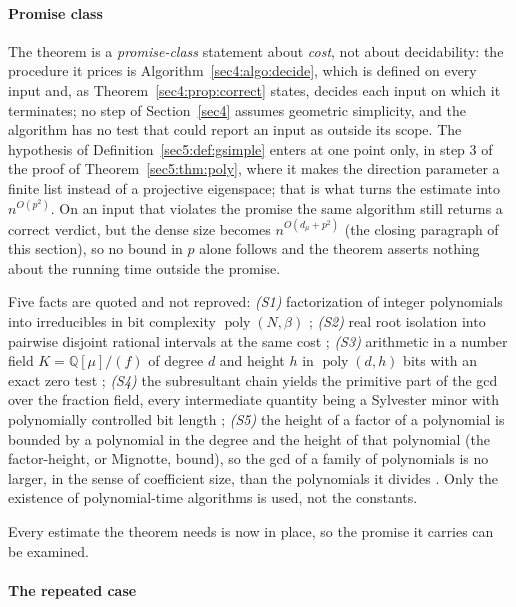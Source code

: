 \documentclass[journal]{IEEEtran}
\theoremstyle{plainn}
\theoremstyle{remark}
\newcommand{\poly}{\operatorname{poly}}
\begin{document}
\paragraph{Promise class} The theorem is a \emph{promise-class} statement about \emph{cost}, not about
decidability: the procedure it prices is Algorithm~\ref{sec4:algo:decide}, which is defined on every input
and, as Theorem~\ref{sec4:prop:correct} states, decides each input on which it terminates; no step of
Section~\ref{sec4} assumes geometric simplicity, and the algorithm has no test that could report an input
as outside its scope. The hypothesis of Definition~\ref{sec5:def:gsimple} enters at one point only, in
step 3 of the proof of Theorem~\ref{sec5:thm:poly}, where it makes the direction parameter a finite list
instead of a projective eigenspace; that is what turns the estimate into $n^{O(p^{2})}$. On an input that
violates the promise the same algorithm still returns a correct verdict, but the dense size becomes
$n^{O(d_\mu+p^{2})}$ (the closing paragraph of this section), so no bound in $p$ alone follows and the
theorem asserts nothing about the running time outside the promise.

Five facts are quoted and not reproved: \emph{(S1)} factorization of integer polynomials into
irreducibles in bit complexity $\poly(N,\beta)$ \cite{vzgg03}; \emph{(S2)} real root isolation into
pairwise disjoint rational intervals at the same cost \cite{bpr06}; \emph{(S3)} arithmetic in a number
field $K=\mathbb{Q}[\mu]/(f)$ of degree $d$ and height $h$ in $\poly(d,h)$ bits with an exact zero
test \cite{lan02,vzgg03}; \emph{(S4)} the subresultant chain yields the primitive part of the gcd over
the fraction field, every intermediate quantity being a Sylvester minor with polynomially controlled
bit length \cite{vzgg03}; \emph{(S5)} the height of a factor of a polynomial is bounded by a polynomial
in the degree and the height of that polynomial (the factor-height, or Mignotte, bound), so the gcd of
a family of polynomials is no larger, in the sense of coefficient size, than the polynomials it divides
\cite{vzgg03,lan02}. Only the existence of polynomial-time algorithms is used, not the constants.


Every estimate the theorem needs is now in place, so the promise it carries can be examined.


\paragraph*{The repeated case}\label{sec5:sub:scope}
\end{document}
